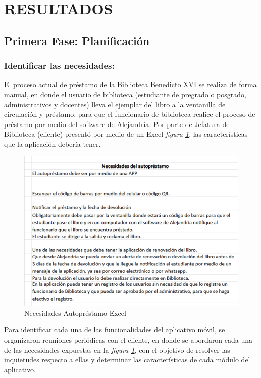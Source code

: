 \documentclass[spanish]{ieee_upb}
\begin{document}
\newpage
\section{RESULTADOS}
\subsection{Primera Fase: Planificación}
\subsubsection{Identificar las necesidades:}
El proceso actual de préstamo de la Biblioteca Benedicto XVI se realiza de forma manual, en donde el usuario de biblioteca (estudiante de pregrado o posgrado, administrativos y docentes) lleva el ejemplar del libro a la ventanilla de circulación y préstamo, para que el funcionario de biblioteca realice el proceso de préstamo por medio del software de Alejandría.  Por parte de Jefatura de Biblioteca (cliente) presentó por medio de un Excel \textit{figura \ref{fig:excelNecesidades}}, las características que la aplicación debería tener. 

\begin{figure}[htpb]
    \centering
    \includegraphics[width=0.7\linewidth]{img/necesidadesAutoprestamo.png}
    \caption[Características Autopréstamo]{Necesidades Autopréstamo Excel}
    \label{fig:excelNecesidades}
\end{figure}

Para identificar cada una de las funcionalidades del aplicativo móvil, se organizaron reuniones periódicas con el cliente, en donde se abordaron cada una de las necesidades expuestas en la \textit{figura \ref{fig:excelNecesidades}}, con el objetivo de resolver las inquietudes respecto a ellas y determinar las características de cada módulo del aplicativo.
\vspace{0.3 cm}
\end{document}
